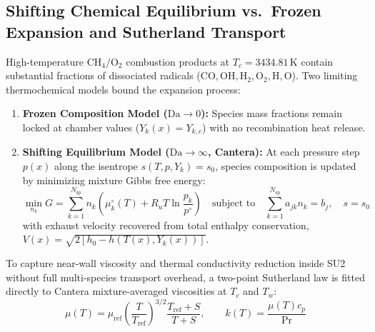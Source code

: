 \documentclass[11pt,a4paper]{article}
\begin{document}
\subsection{Shifting Chemical Equilibrium vs.\ Frozen Expansion and Sutherland Transport}
High-temperature $\mathrm{CH_4/O_2}$ combustion products at $T_c = 3434.81\,\mathrm{K}$ contain substantial fractions of dissociated radicals ($\mathrm{CO}, \mathrm{OH}, \mathrm{H_2}, \mathrm{O_2}, \mathrm{H}, \mathrm{O}$). Two limiting thermochemical models bound the expansion process:
\begin{enumerate}
    \item \textbf{Frozen Composition Model ($\mathrm{Da} \to 0$):} Species mass fractions remain locked at chamber values ($Y_k(x) = Y_{k,c}$) with no recombination heat release.
    \item \textbf{Shifting Equilibrium Model ($\mathrm{Da} \to \infty$, Cantera):} At each pressure step $p(x)$ along the isentrope $s(T, p, Y_k) = s_0$, species composition is updated by minimizing mixture Gibbs free energy:
    \begin{equation}
    \min_{n_k} G = \sum_{k=1}^{N_{\mathrm{sp}}} n_k \left( \mu_k^\circ(T) + R_u T \ln \frac{p_k}{p^\circ} \right) \quad \text{subject to} \quad \sum_{k=1}^{N_{\mathrm{sp}}} a_{jk} n_k = b_j, \quad s = s_0
    \end{equation}
    with exhaust velocity recovered from total enthalpy conservation, $V(x) = \sqrt{2\left[h_0 - h(T(x), Y_k(x))\right]}$.
\end{enumerate}
To capture near-wall viscosity and thermal conductivity reduction inside SU2 without full multi-species transport overhead, a two-point Sutherland law is fitted directly to Cantera mixture-averaged viscosities at $T_c$ and $T_w$:
\begin{equation}
\mu(T) = \mu_{\mathrm{ref}} \left(\frac{T}{T_{\mathrm{ref}}}\right)^{3/2} \frac{T_{\mathrm{ref}} + S}{T + S}, \qquad k(T) = \frac{\mu(T) c_p}{\mathrm{Pr}}
\end{equation}
\end{document}
